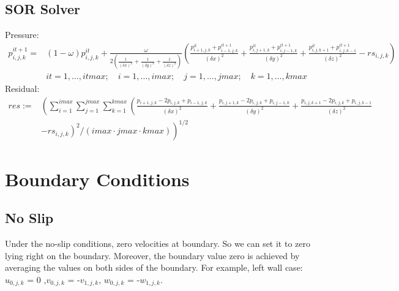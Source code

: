 \documentclass{article}%
\begin{document}
\subsection{SOR Solver}
Pressure:\\
\begin{equation}
\begin{split}
p^{it+1}_{i,j,k} = & (1 - \omega) p^{it}_{i,j,k} + \frac{\omega}{2 (\frac{1}{(\delta x)^2} + \frac{1}{(\delta y)^2} + \frac{1}{(\delta z)^2})} \left( \frac{p^{it}_{i+1,j,k} + p^{it+1}_{i-1,j,k}}{(\delta x)^2} + \frac{p^{it}_{i,j+1,k} + p^{it+1}_{i,j-1,k}}{(\delta y)^2} + \frac{p^{it}_{i,j,k+1} + p^{it+1}_{i,j,k-1}}{(\delta z)^2} - rs_{i,j,k} \right)\\
& it = 1,\ldots,itmax; \quad i = 1,\ldots,imax; \quad j = 1,\ldots,jmax; \quad k = 1,\ldots,kmax
\end{split}
\end{equation}
Residual:\\
\begin{equation}
\begin{split}
res := & \left( \sum_{i=1}^{imax} \sum_{j=1}^{jmax} \sum_{k=1}^{kmax} \left( \frac{p_{i+1,j,k} - 2 p_{i,j,k} + p_{i-1,j,k}}{(\delta x)^2} + \frac{p_{i,j+1,k} - 2 p_{i,j,k} + p_{i,j-1,k}}{(\delta y)^2} + \frac{p_{i,j,k+1} - 2 p_{i,j,k} + p_{i,j,k-1}}{(\delta z)^2} \right. \right. \\
& \left. \left. - rs_{i,j,k} \right)^2 / (imax \cdot jmax \cdot kmax) \right)^{1/2}
\end{split}
\end{equation}
\section{Boundary Conditions}
\subsection{No Slip} 
Under the no-slip conditions, zero velocities at boundary. So we can set it to zero lying right on the boundary. Moreover, the boundary value zero is achieved by averaging the values on both sides of the boundary. For example, left wall case: $u_{0,j,k}$ = 0 ,$v_{0,j,k}$ = -$v_{1,j,k}$, $w_{0,j,k}$ = -$w_{1,j,k}$.
\end{document}
